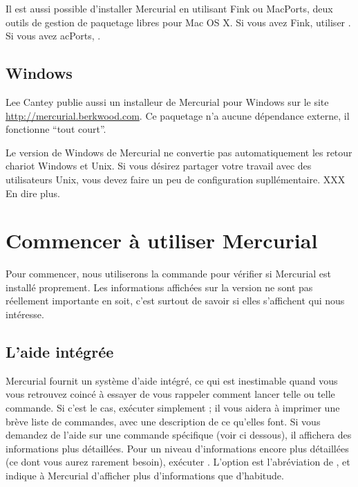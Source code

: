 Il est aussi possible d'installer Mercurial en utilisant Fink ou MacPorts,
deux outils de gestion de paquetage libres pour Mac OS X. Si vous avez 
Fink, utiliser . Si vous avez 
acPorts, .

\subsection{Windows}

Lee Cantey publie aussi un installeur de Mercurial pour Windows sur le site
\url{http://mercurial.berkwood.com}. Ce paquetage n'a aucune dépendance 
externe, il fonctionne ``tout court''.

\begin{note}
  Le version de Windows de Mercurial ne convertie pas automatiquement
  les retour chariot Windows et Unix. Si vous désirez partager votre
  travail avec des utilisateurs Unix, vous devez faire un peu de configuration
  supllémentaire. XXX En dire plus.
\end{note}

\section{Commencer à utiliser Mercurial}

Pour commencer, nous utiliserons la commande  pour vérifier
si Mercurial est installé proprement. Les informations affichées sur la 
version ne sont pas réellement importante en soit, c'est surtout de savoir
si elles s'affichent qui nous intéresse.

\subsection{L'aide intégrée}

Mercurial fournit un système d'aide intégré, ce qui est inestimable quand
vous vous retrouvez coincé à essayer de vous rappeler comment lancer telle
ou telle commande. 
Si c'est le cas, exécuter simplement ; il vous aidera à imprimer
une brève liste de commandes, avec une description de ce qu'elles font. Si vous
demandez de l'aide sur une commande spécifique (voir ci dessous), il affichera
des informations plus détaillées.
Pour un niveau d'informations encore plus détaillées (ce dont vous aurez rarement
besoin), exécuter .  L'option  est 
l'abréviation de , et indique à Mercurial d'afficher plus 
d'informations que d'habitude.

